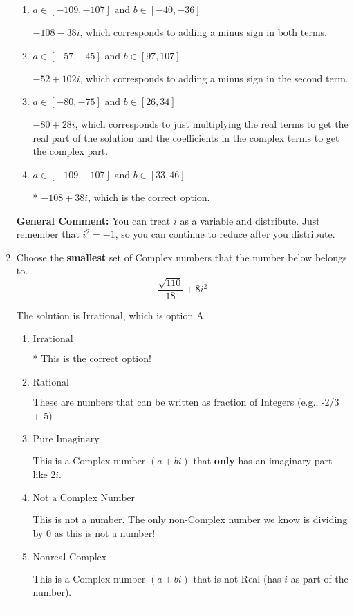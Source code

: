 \documentclass{extbook}[14pt]
\newcommand{\litem}[1]{\item #1

\rule{\textwidth}{0.4pt}}
\begin{document}
\begin{enumerate}
{\begin{enumerate}[label=\Alph*.]
 $-52 - 102 i$, which corresponds to adding a minus sign in the first term.
\item \( a \in [-109, -107] \text{ and } b \in [-40, -36] \)

 $-108 - 38 i$, which corresponds to adding a minus sign in both terms.
\item \( a \in [-57, -45] \text{ and } b \in [97, 107] \)

 $-52 + 102 i$, which corresponds to adding a minus sign in the second term.
\item \( a \in [-80, -75] \text{ and } b \in [26, 34] \)

 $-80 + 28 i$, which corresponds to just multiplying the real terms to get the real part of the solution and the coefficients in the complex terms to get the complex part.
\item \( a \in [-109, -107] \text{ and } b \in [33, 46] \)

* $-108 + 38 i$, which is the correct option.
\end{enumerate}

\textbf{General Comment:} You can treat $i$ as a variable and distribute. Just remember that $i^2=-1$, so you can continue to reduce after you distribute.
}
\litem{
Choose the \textbf{smallest} set of Complex numbers that the number below belongs to.
\[ \frac{\sqrt{110}}{18}+8i^2 \]

The solution is \( \text{Irrational} \), which is option A.\begin{enumerate}[label=\Alph*.]
\item \( \text{Irrational} \)

* This is the correct option!
\item \( \text{Rational} \)

These are numbers that can be written as fraction of Integers (e.g., -2/3 + 5)
\item \( \text{Pure Imaginary} \)

This is a Complex number $(a+bi)$ that \textbf{only} has an imaginary part like $2i$.
\item \( \text{Not a Complex Number} \)

This is not a number. The only non-Complex number we know is dividing by 0 as this is not a number!
\item \( \text{Nonreal Complex} \)

This is a Complex number $(a+bi)$ that is not Real (has $i$ as part of the number).
\end{enumerate}

}
\end{enumerate}
\end{document}
